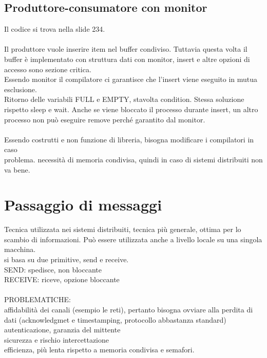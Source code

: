 \documentclass{article}
\begin{document}
\subsection{Produttore-consumatore con monitor}
Il codice si trova nella slide 234.\\
\\
Il produttore vuole inserire item nel buffer condiviso. Tuttavia questa volta il buffer è implementato con struttura dati con monitor, insert e altre opzioni di accesso sono sezione critica.\\
Essendo monitor il compilatore ci garantisce che l'insert viene eseguito in mutua esclusione.\\
Ritorno delle variabili FULL e EMPTY, stavolta condition.
Stessa soluzione rispetto sleep e wait. Anche se viene bloccato il processo durante insert, un altro processo non può eseguire remove perché garantito dal monitor.\\
\\
Essendo costrutti e non funzione di libreria, bisogna modificare i compilatori in caso\\
problema. necessità di memoria condivisa, quindi in caso di sistemi distribuiti non va bene.
\section{Passaggio di messaggi}
Tecnica utilizzata nei sistemi distribuiti, tecnica più generale, ottima per lo scambio di informazioni. Può essere utilizzata anche a livello locale su una singola macchina.\\
si basa su due primitive, send e receive.\\
SEND: spedisce, non bloccante\\
RECEIVE: riceve, opzione bloccante\\
\\
PROBLEMATICHE:\\
affidabilità dei canali (esempio le reti), pertanto bisogna ovviare alla perdita di dati (acknowledgmet e timestamping, protocollo abbastanza standard)\\
autenticazione, garanzia del mittente\\
sicurezza e rischio intercettazione\\
efficienza, più lenta rispetto a memoria condivisa e semafori.\\
\end{document}
